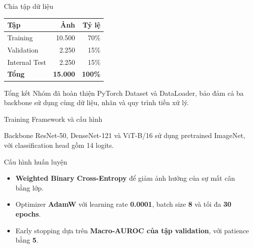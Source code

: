 \documentclass[10pt]{beamer}
\begin{document}
\begin{frame}{Chia tập dữ liệu}
    \begin{center}
        \small
        \begin{tabularx}{0.78\textwidth}{@{}Xrr@{}}
            \toprule
            \textbf{Tập} & \textbf{Ảnh} & \textbf{Tỷ lệ} \\
            \midrule
            Training & 10.500 & 70\% \\
            Validation & 2.250 & 15\% \\
            Internal Test & 2.250 & 15\% \\
            \textbf{Tổng} & \textbf{15.000} & \textbf{100\%} \\
            \bottomrule
        \end{tabularx}
    \end{center}
    \vspace{0.3cm}
    \begin{center}
        \begin{minipage}{0.88\textwidth}
            \begin{block}{Tổng kết}
                \small Nhóm đã hoàn thiện PyTorch Dataset và DataLoader, bảo đảm cả ba backbone sử dụng cùng dữ liệu, nhãn và quy trình tiền xử lý.
            \end{block}
        \end{minipage}
    \end{center}
\end{frame}

\begin{frame}{Training Framework và cấu hình}
    \begin{block}{Backbone}
        \small ResNet-50, DenseNet-121 và ViT-B/16 sử dụng pretrained ImageNet, với classification head gồm 14 logits.
    \end{block}
    \vspace{0.2cm}
    \begin{block}{Cấu hình huấn luyện}
        \small
        \begin{itemize}
            \item \textbf{Weighted Binary Cross-Entropy} để giảm ảnh hưởng của sự mất cân bằng lớp.
            \item Optimizer \textbf{AdamW} với learning rate \textbf{0.0001}, batch size \textbf{8} và tối đa \textbf{30 epochs}.
            \item Early stopping dựa trên \textbf{Macro-AUROC của tập validation}, với patience bằng \textbf{5}.
        \end{itemize}
    \end{block}
\end{frame}
\end{document}
